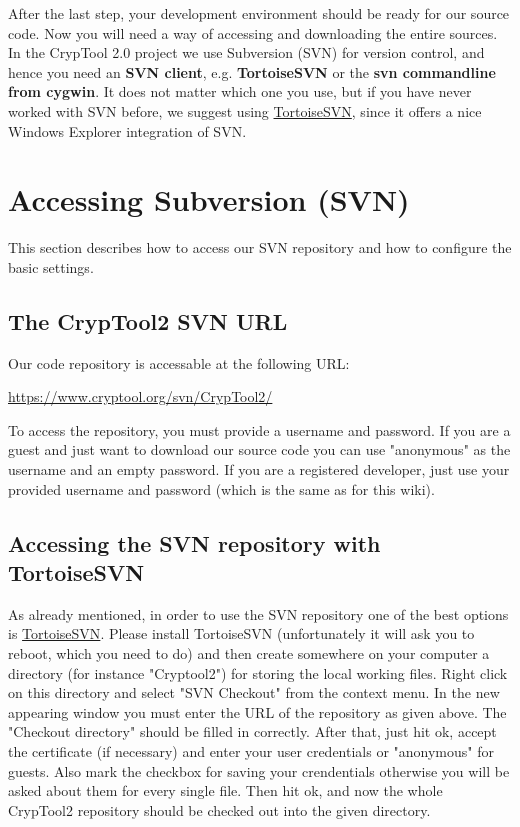 After the last step, your development environment should be ready for our source code. Now you will need a way of accessing and downloading the entire sources. In the CrypTool 2.0 project we use Subversion (SVN) for version control, and hence you need an \textbf{SVN client}, e.g. \textbf{TortoiseSVN} or the \textbf{svn commandline from cygwin}. It does not matter which one you use, but if you have never worked with SVN before, we suggest using \href{http://www.tortoisesvn.net/}{TortoiseSVN}, since it offers a nice Windows Explorer integration of SVN.

\section{Accessing Subversion (SVN)}

This section describes how to access our SVN repository and how to configure the basic settings.

\subsection*{The CrypTool2 SVN URL}

Our code repository is accessable at the following URL:

\url{https://www.cryptool.org/svn/CrypTool2/}

To access the repository, you must provide a username and password. If you are a guest and just want to download our source code you can use "anonymous" as the username and an empty password. If you are a registered developer, just use your provided username and password (which is the same as for this wiki).

\subsection*{Accessing the SVN repository with TortoiseSVN}

As already mentioned, in order to use the SVN repository one of the best options is \href{http://www.tortoisesvn.net/}{TortoiseSVN}. Please install TortoiseSVN (unfortunately it will ask you to reboot, which you need to do) and then create somewhere on your computer a directory (for instance "Cryptool2") for storing the local working files. Right click on this directory and select "SVN Checkout" from the context menu. In the new appearing window you must enter the URL of the repository as given above. The "Checkout directory" should be filled in correctly. After that, just hit ok, accept the certificate (if necessary) and enter your user credentials or "anonymous" for guests. Also mark the checkbox for saving your crendentials otherwise you will be asked about them for every single file. Then hit ok, and now the whole CrypTool2 repository should be checked out into the given directory.

